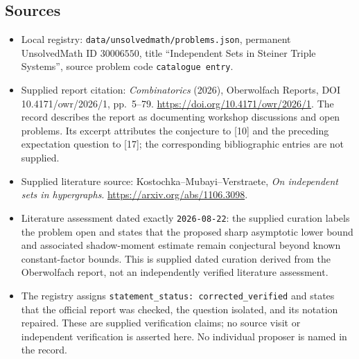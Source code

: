 \documentclass[11pt]{article}
\begin{document}
\subsection{Sources}
\begin{itemize}
\item Local registry: \texttt{data/unsolvedmath/problems.json}, permanent UnsolvedMath ID \(30006550\), title ``Independent Sets in Steiner Triple Systems'', source problem code \texttt{catalogue entry}.
\item Supplied report citation: \emph{Combinatorics} (2026), Oberwolfach Reports, DOI 10.4171/owr/2026/1, pp.~5--79. \url{https://doi.org/10.4171/owr/2026/1}. The record describes the report as documenting workshop discussions and open problems. Its excerpt attributes the conjecture to [10] and the preceding expectation question to [17]; the corresponding bibliographic entries are not supplied.
\item Supplied literature source: Kostochka--Mubayi--Verstraete, \emph{On independent sets in hypergraphs}. \url{https://arxiv.org/abs/1106.3098}.
\item Literature assessment dated exactly \texttt{2026-08-22}: the supplied curation labels the problem open and states that the proposed sharp asymptotic lower bound and associated shadow-moment estimate remain conjectural beyond known constant-factor bounds. This is supplied dated curation derived from the Oberwolfach report, not an independently verified literature assessment.
\item The registry assigns \texttt{statement\_status: corrected\_verified} and states that the official report was checked, the question isolated, and its notation repaired. These are supplied verification claims; no source visit or independent verification is asserted here. No individual proposer is named in the record.
\end{itemize}
\end{document}
